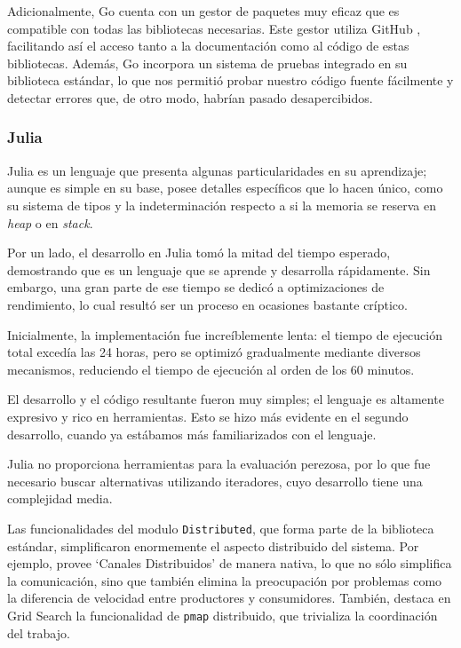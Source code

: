\documentclass[11pt]{article}
\let\Oldsubsubsection\subsubsection
\renewcommand{\subsubsection}{\FloatBarrier\Oldsubsubsection}
\newcommand{\english}[1]{\textit{#1}}
\begin{document}
Adicionalmente, Go cuenta con un gestor de paquetes muy eficaz que es compatible con todas las bibliotecas necesarias. Este gestor utiliza GitHub \cite{com:github}, facilitando así el acceso tanto a la documentación como al código de estas bibliotecas. Además, Go incorpora un sistema de pruebas integrado en su biblioteca estándar, lo que nos permitió probar nuestro código fuente fácilmente y detectar errores que, de otro modo, habrían pasado desapercibidos.

\subsubsection{Julia}

Julia es un lenguaje que presenta algunas particularidades en su aprendizaje; aunque es simple en su base, posee detalles específicos que lo hacen único, como su sistema de tipos y la indeterminación respecto a si la memoria se reserva en \english{heap} o en \english{stack}.

Por un lado, el desarrollo en Julia tomó la mitad del tiempo esperado, demostrando que es un lenguaje que se aprende y desarrolla rápidamente. Sin embargo, una gran parte de ese tiempo se dedicó a optimizaciones de rendimiento, lo cual resultó ser un proceso en ocasiones bastante críptico.

Inicialmente, la implementación fue increíblemente lenta: el tiempo de ejecución total excedía las 24 horas, pero se optimizó gradualmente mediante diversos mecanismos, reduciendo el tiempo de ejecución al orden de los 60 minutos.

El desarrollo y el código resultante fueron muy simples; el lenguaje es altamente expresivo y rico en herramientas. Esto se hizo más evidente en el segundo desarrollo, cuando ya estábamos más familiarizados con el lenguaje.

Julia no proporciona herramientas para la evaluación perezosa, por lo que fue necesario buscar alternativas utilizando iteradores, cuyo desarrollo tiene una complejidad media.

Las funcionalidades del modulo \lstinline{Distributed}, que forma parte de la biblioteca estándar, simplificaron enormemente el aspecto distribuido del sistema. Por ejemplo, provee ‘Canales Distribuidos’ de manera nativa, lo que no sólo simplifica la comunicación, sino que también elimina la preocupación por problemas como la diferencia de velocidad entre productores y consumidores. También, destaca en Grid Search la funcionalidad de \lstinline{pmap} distribuido, que trivializa la coordinación del trabajo.
\end{document}
